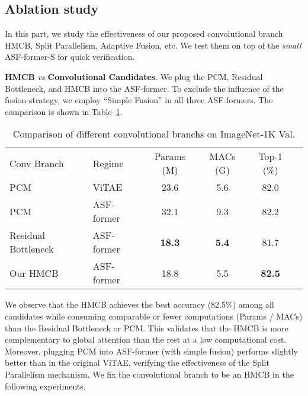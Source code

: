 \documentclass[lettersize,journal]{IEEEtran}
\begin{document}
\subsection{Ablation study}
\label{sec:abla}
In this part, we study the effectiveness of our proposed convolutional branch HMCB, Split Parallelism, Adaptive Fusion, etc. We test them on top of the \textit{small} ASF-former-S for quick verification. 

\textbf{HMCB} \textit{vs} \textbf{Convolutional Candidates}. We plug the PCM, Residual Bottleneck, and HMCB into the ASF-former. To exclude the influence of the fusion strategy, we employ ``Simple Fusion'' in all three ASF-formers. The comparison is shown in Table~\ref{table:convbranch}.
\setlength{\tabcolsep}{4pt}
\begin{table}[th]
\begin{center}
\caption{Comparison of different convolutional branchs on ImageNet-1K Val.}
\label{table:convbranch}
\begin{tabular}{llcccc}
\hline\noalign{\smallskip}
Conv Branch &Regime &Params (M)&MACs (G) &Top-1 (\%)\\
\noalign{\smallskip}
\hline
\noalign{\smallskip}
PCM &ViTAE \cite{Xu2021ViTAEVT}& 23.6 & 5.6 & 82.0 \\
PCM &ASF-former& 32.1 & 9.3 & 82.2 \\
Residual Bottleneck&ASF-former& \textbf{18.3} & \textbf{5.4} & 81.7\\
Our HMCB&ASF-former& 18.8 & 5.5 & \textbf{82.5} \\
\hline
\end{tabular}
\end{center}
\end{table}
\setlength{\tabcolsep}{1.4pt}

We observe that the HMCB achieves the best accuracy (82.5\%) among all candidates while consuming comparable or fewer computations (Params / MACs) than the Residual Bottleneck or PCM. This validates that the HMCB is more complementary to global attention than the rest at a low computational cost. Moreover, plugging PCM into ASF-former (with simple fusion) performs slightly better than in the original ViTAE, verifying the effectiveness of the Split Parallelism mechanism. We fix the convolutional branch to be an HMCB in the following experiments.
\end{document}
